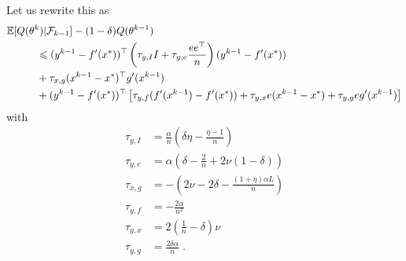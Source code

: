 \documentclass{article}
\def\E{_{\scriptscriptstyle E}}
\def \E{{\mathbb E}}
\def \E{{\mathbb E}}
\begin{document}
Let us rewrite this as
\begin{align*}
& \E [ Q(\theta^k) | \mathcal{F}_{k-1} ] - ( 1 - \delta) Q(\theta^{k-1}) \\
& \hspace*{1cm} \leqslant (y^{k-1} - f'(x^\ast))^\top \left(\tau_{y, I}I + \tau_{y, e}\frac{ee^\top}{n}\right)(y^{k-1} - f'(x^\ast))\\
& \hspace*{1cm}+ \tau_{x, g} (x^{k-1} -x^\ast)^\top g'(x^{k-1})\\
& \hspace*{1cm}+ (y^{k-1} - f'(x^\ast))^\top \left[\tau_{y, f}( f'(x^{k-1}) - f'(x^\ast)) + \tau_{y, x} e (x^{k-1} -x^\ast)+ \tau_{y, g} e g'(x^{k-1})\right]
\end{align*}
with
\begin{align*}
\tau_{y, I} &= \frac{\alpha}{n} \left(\delta\eta - \frac{\eta - 1}{n}\right)\\
\tau_{y, e} &= \alpha \left(\delta - \frac{2}{n} + 2 \nu(1 - \delta)\right)\\
\tau_{x,g} & = - ( 2 \nu - 2 \delta - \frac{(1+\eta) \alpha L}{n} )\\
\tau_{y,f} &= - \frac{2\alpha}{n^2}\\
\tau_{y,x}&= 2\left(\frac{1}{n}-\delta\right) \nu\\
\tau_{y,g}&= \frac{2\delta\alpha}{n}\; .
\end{align*}
\end{document}
